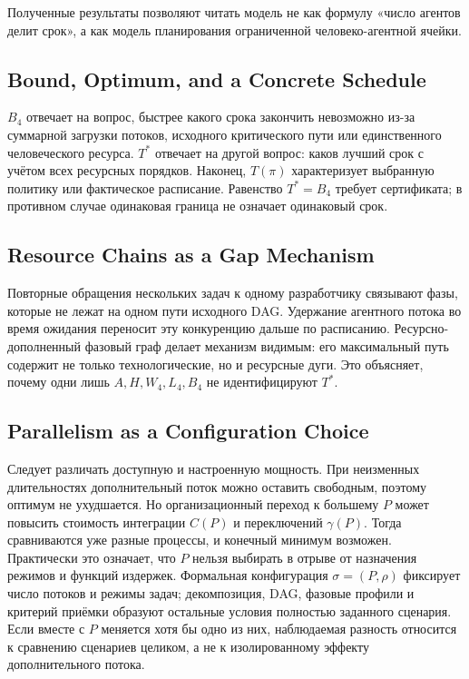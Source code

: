 Полученные результаты позволяют читать модель не как формулу «число агентов
делит срок», а как модель планирования ограниченной человеко-агентной ячейки.

\subsection{Bound, Optimum, and a Concrete Schedule}

$B_4$ отвечает на вопрос, быстрее какого срока закончить невозможно из-за
суммарной загрузки потоков, исходного критического пути или единственного
человеческого ресурса. $T^*$ отвечает на другой вопрос: каков лучший срок с
учётом всех ресурсных порядков. Наконец, $T(\pi)$ характеризует выбранную
политику или фактическое расписание. Равенство $T^*=B_4$ требует сертификата;
в противном случае одинаковая граница не означает одинаковый срок.

\subsection{Resource Chains as a Gap Mechanism}

Повторные обращения нескольких задач к одному разработчику связывают фазы,
которые не лежат на одном пути исходного DAG. Удержание агентного потока во
время ожидания переносит эту конкуренцию дальше по расписанию. Ресурсно-
дополненный фазовый граф делает механизм видимым: его максимальный путь
содержит не только технологические, но и ресурсные дуги. Это объясняет, почему
одни лишь $A,H,W_4,L_4,B_4$ не идентифицируют $T^*$.

\subsection{Parallelism as a Configuration Choice}

Следует различать доступную и настроенную мощность. При неизменных длительностях
дополнительный поток можно оставить свободным, поэтому оптимум не ухудшается.
Но организационный переход к большему $P$ может повысить стоимость интеграции
$C(P)$ и переключений $\gamma(P)$. Тогда сравниваются уже разные процессы, и
конечный минимум возможен. Практически это означает, что $P$ нельзя выбирать в
отрыве от назначения режимов и функций издержек. Формальная конфигурация
$\sigma=(P,\rho)$ фиксирует число потоков и режимы задач; декомпозиция, DAG,
фазовые профили и критерий приёмки образуют остальные условия полностью
заданного сценария. Если вместе с $P$ меняется хотя бы одно из них, наблюдаемая
разность относится к сравнению сценариев целиком, а не к изолированному эффекту
дополнительного потока.

